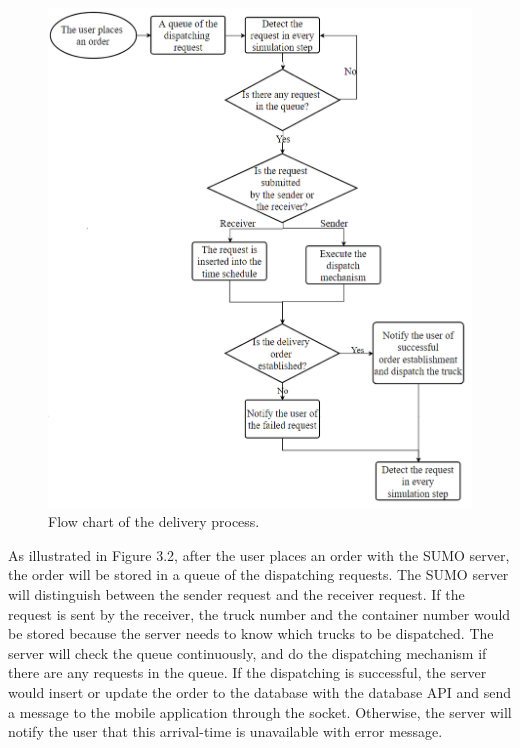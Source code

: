 \documentclass[12pt]{ksthesis}
\begin{document}
\begin{thesis}
{\begin{figure}[H]
\centering
\includegraphics[width=1.0\textwidth]{./figures/F3-2_Flowchart.PNG}
\caption{\large Flow chart of the delivery process.}
\vspace{0.5cm}
\label{Fig:flow_chart}
\end{figure}




As illustrated in Figure 3.2, after the user places an order with the SUMO server, the order will be stored in a queue of the dispatching requests. The SUMO server will distinguish between the sender request and the receiver request. If the request is sent by the receiver, the truck number and the container number would be stored because the server needs to know which trucks to be dispatched. The server will check the queue continuously, and do the dispatching mechanism if there are any requests in the queue. If the dispatching is successful, the server would insert or update the order to the database with the database API and send a message to the mobile application through the socket. Otherwise, the server will notify the user that this arrival-time is unavailable with error message. 

}
\end{thesis}
\end{document}

